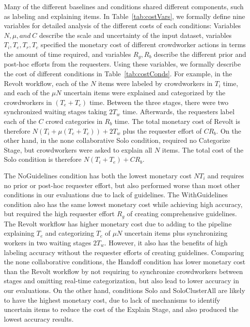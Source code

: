 Many of the different baselines and conditions shared different components, such as labeling and explaining items. In Table~\ref{tab:costVars}, we formally define nine variables for detailed analysis of the different costs of each conditions: Variables $N, \mu, and~C$ describe the scale and uncertainty of the input dataset, variables $T_i, T_e, T_r, T_c$ specified the monetary cost of different crowdworker actions in terms the amount of time required, and variables $R_g, R_b$ describe the different prior and post-hoc efforts from the requesters. Using these variables, we formally describe the cost of different conditions in Table~\ref{tab:costConds}. For example, in the Revolt workflow, each of the $N$ items were labeled by crowdworkers in $T_i$ time, and each of the $\mu N$ uncertain items were explained and categorized by the crowdworkers in $(T_e+T_c)$ time. Between the three stages, there were two synchronized waiting stages taking $2T_w$ time. Afterwards, the requesters label each of the $C$ crowd categories in $R_b$ time. The total monetary cost of Revolt is therefore $N(T_i + \mu(T_e+T_c)) + 2 T_w$ plus the requester effort of $CR_b$. On the other hand, in the none collaborative Solo condition, required no Categorize Stage, but crowdworkers were asked to explain all $N$ items. The total cost of the Solo condition is therefore $N(T_i+T_e) + CR_b$.



The NoGuidelines condition has both the lowest monetary cost $NT_i$ and requires no prior or post-hoc requester effort, but also performed worse than most other conditions in our evaluations due to lack of guidelines. The WithGuidelines condition also has the same lowest monetary cost while achieving high accuracy, but required the high requester effort $R_g$ of creating comprehensive guidelines.
The Revolt workflow has higher monetary cost due to adding to the pipeline explaining $T_e$ and categorizing $T_c$ of $\mu N$ uncertain items plus synchronizing workers in two waiting stages $2T_w$. However, it also has the benefits of high labeling accuracy without the requester efforts of creating guidelines. Comparing the none collaborative conditions, the Handoff condition has lower monetary cost than the Revolt workflow by not requiring to synchronize crowdworkers between stages and omitting real-time categorization, but also lead to lower accuracy in our evaluations. On the other hand, conditions Solo and SoloClusterAll are likely to have the highest monetary cost, due to lack of mechanisms to identify uncertain items to reduce the cost of the Explain Stage, and also produced the lowest accuracy results. 

